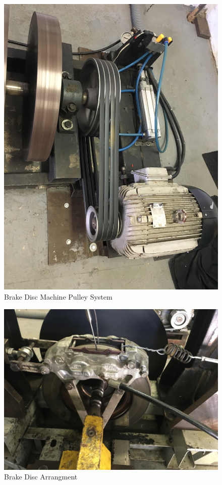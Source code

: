 		\begin{figure}[htbp]
			\centering
			\includegraphics[scale=0.05]{figuras/fig-brake-disc-machine-pulley}
			\caption{Brake Disc Machine Pulley System}
			\label{fig:brake-disc-machine-pulley}
		\end{figure}

		\begin{figure}[htbp]
			\centering
			\includegraphics[scale=0.05]{figuras/fig-brake-disc}
			\caption{Brake Disc Arrangment}
			\label{fig:brake-disc}
		\end{figure}
		\par

